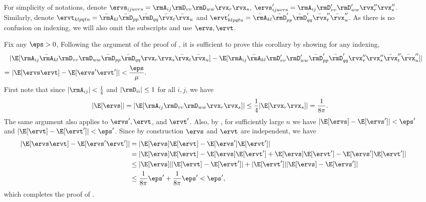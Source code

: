 \begin{proofof}{}
For simplicity of notations, denote $\ervs_{ijuvrs} = \rmA_{ij}\rmD_{vv}\rmD_{ww}\rvx_r\rvx_s$, $\ervs'_{ijuvrs} = \rmA_{ij}\rmD'_{vv}\rmD'_{ww}\rvx''_r\rvx''_s$. Similarly, denote $\ervt_{klpqtu}=\bar\rmA_{kl}\bar\rmD_{pp}\bar\rmD_{qq}\bar\rvx_t\bar\rvx_u$ and $\ervt'_{klpqtu}=\bar\rmA_{kl}\bar\rmD'_{pp}\bar\rmD'_{qq}\bar\rvx''_t\bar\rvx''_u$. As there is no confusion on indexing, we will also omit the subscripts and use $\ervs, \ervt$.

Fix any $\eps>0$, Following the argument of the proof of , it is sufficient to prove this corollary by showing for any indexing, \begin{equation}
\begin{split}
&|\E[\rmA_{ij}\bar\rmA_{kl}\rmD_{vv}\rmD_{ww}\bar\rmD_{pp}\bar\rmD_{qq}\rvx_r\rvx_s\bar\rvx_t\bar\rvx_u] - \E[\rmA_{ij}\bar\rmA_{kl}\rmD_{vv}'\rmD_{ww}'\bar\rmD_{pp}'\bar\rmD_{qq}'\rvx_r''\rvx_s''\bar\rvx_t''\bar\rvx_u'']|\\
=&\ |\E[\ervs\ervt] - \E[\ervs'\ervt']|< \frac\eps\mu.
\end{split}
\end{equation}
First note that since $|\rmA_{ij}| < \frac14$ and $|\rmD_{ii}| \leq 1$ for all $i,j$, we have \begin{equation}
\begin{split}
|\E[\ervs]| &= |\E[\rmA_{ij}\rmD_{vv}\rmD_{ww}\rvx_r\rvx_s]|
\leq \frac14|\E[\rvx_r\rvx_s]| = \frac{1}{8\pi}.
\end{split}
\end{equation} The same argument also applies to $\ervs', \ervt$, and $\ervt'$.
Also, by , for sufficiently large $n$ we have $|\E[\ervs] - \E[\ervs']|<\eps'$ and $|\E[\ervt] - \E[\ervt']|<\eps'$. Since by construction $\ervs$ and $\ervt$ are independent, we have
\begin{equation}
\begin{split}
|\E[\ervs\ervt] - \E[\ervs'\ervt']|&=|\E[\ervs]\E[\ervt] - \E[\ervs']\E[\ervt']|\\ &=|\E[\ervs]\E[\ervt] - \E[\ervs]\E[\ervt'] + \E[\ervs]\E[\ervt'] - \E[\ervs']\E[\ervt']|\\
&\leq |\E[\ervs]||\E[\ervt] - \E[\ervt']| + |\E[\ervt']||\E[\ervs] - \E[\ervs']|\\
&\leq \frac{1}{8\pi}\eps' + \frac{1}{8\pi}\eps' < \eps',
\end{split}
\end{equation}
which completes the proof of .
\end{proofof}


